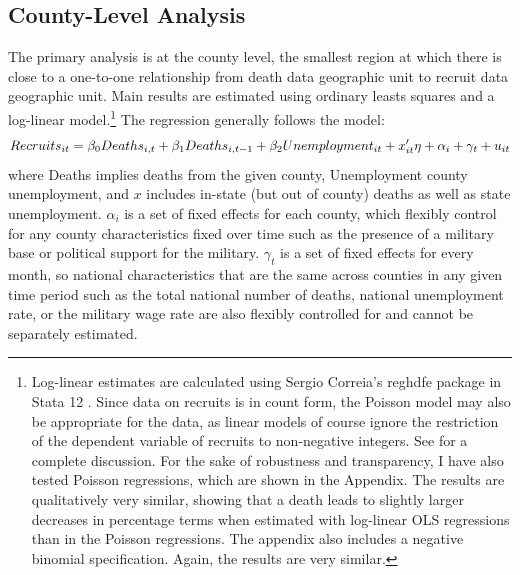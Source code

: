\documentclass[12pt] {article}
\begin{document}
\subsection{County-Level Analysis\label{sub:County OLS}}

The primary analysis is at the county level, the smallest region at which there is close to a one-to-one relationship from death data geographic unit to recruit data geographic unit. Main results are estimated using ordinary leasts squares and a log-linear model.\footnote{Log-linear estimates are calculated using Sergio Correia's reghdfe package in Stata 12 \citep{reghdfe}. Since data on recruits is in count form, the Poisson model may also be appropriate for the data, as linear models of course ignore the restriction of the dependent variable of recruits to non-negative integers. See \cite{cameron2013countdata} for a complete discussion. For the sake of robustness and transparency, I have also tested Poisson regressions, which are shown in the Appendix. The results are qualitatively very similar, showing that a death leads to slightly larger decreases in percentage terms when estimated with log-linear OLS regressions than in the Poisson regressions. The appendix also includes a negative binomial specification. Again, the results are very similar.} The regression generally follows the model:
$$Recruits_{it}=\beta_{0}Deaths_{i,t}+\beta_{1}Deaths_{i,t-1}+\beta_{2}Unemployment_{it}\\
+x'_{it}\eta+\alpha_{i}+\gamma_{t}+u_{it}$$
where Deaths implies deaths from the given county, Unemployment county unemployment, and $x$ includes in-state (but out of county) deaths as well as
state unemployment. $\alpha_{i}$ is a set of fixed effects for each county, which flexibly control for any county characteristics fixed over time such as the presence of a military base or political support for the military. $\gamma_{t}$ is a set of fixed effects for every month, so national characteristics that are the same across counties in any given time period such as the total national number of deaths, national
unemployment rate, or the military wage rate are also flexibly controlled for and cannot be separately estimated. 

\begin{table}
\caption{}
\label{Flo:loglinear}
\scalebox{0.9}{

}
\end{table}
\end{document}
